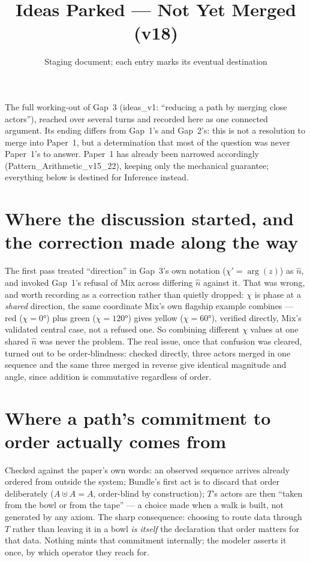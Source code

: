 \documentclass[11pt]{article}
\title{Ideas Parked --- Not Yet Merged (v18)}
\author{Staging document; each entry marks its eventual destination}
\date{}
\begin{document}
\maketitle

\noindent The full working-out of Gap~3 (ideas\_v1: ``reducing a
path by merging close actors''), reached over several turns and
recorded here as one connected argument. Its ending differs from
Gap~1's and Gap~2's: this is not a resolution to merge into Paper~1,
but a determination that most of the question was never Paper~1's
to answer. Paper~1 has already been narrowed accordingly
(Pattern\_Arithmetic\_v15\_22), keeping only the mechanical
guarantee; everything below is destined for Inference instead.

\section{Where the discussion started, and the correction made along
the way}

The first pass treated ``direction'' in Gap~3's own notation
($\chi'=\arg(z)$) as $\hat n$, and invoked Gap~1's refusal of Mix
across differing $\hat n$ against it. That was wrong, and worth
recording as a correction rather than quietly dropped: $\chi$ is
phase at a \emph{shared} direction, the same coordinate Mix's own
flagship example combines --- red ($\chi=0°$) plus green
($\chi=120°$) gives yellow ($\chi=60°$), verified directly,
Mix's validated central case, not a refused one. So combining
different $\chi$ values at one shared $\hat n$ was never the
problem. The real issue, once that confusion was cleared, turned out
to be order-blindness: checked directly, three actors merged in one
sequence and the same three merged in reverse give identical
magnitude and angle, since addition is commutative regardless of
order.

\section{Where a path's commitment to order actually comes from}

Checked against the paper's own words: an observed sequence arrives
already ordered from outside the system; Bundle's first act is to
discard that order deliberately ($A\uplus A=A$, order-blind by
construction); $T$'s actors are then ``taken from the bowl or from
the tape'' --- a choice made when a walk is built, not generated by
any axiom. The sharp consequence: choosing to route data through $T$
rather than leaving it in a bowl \emph{is itself} the declaration
that order matters for that data. Nothing mints that commitment
internally; the modeler asserts it once, by which operator they
reach for.
\end{document}
